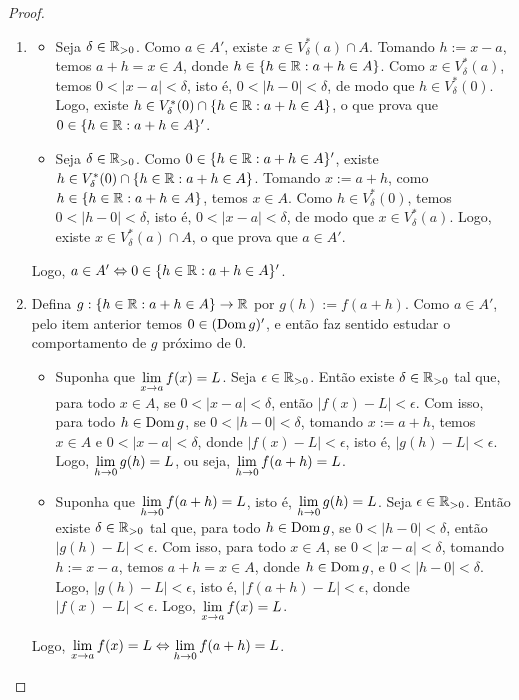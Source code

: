 \begin{proof}
    \leavevmode
        \begin{enumerate}[leftmargin=*, align=left, label=\textbf{(\alph*)}]
            \item 
                \begin{itemize}[leftmargin=*, style=nextline]
                    \item[($\Rightarrow$)] Seja $\delta \in \mathbb{R}_{>0}$. Como $a \in A'$, existe $x \in V^*_{\delta}(a) \cap A$. Tomando $h := x-a$, temos $a+h = x \in A$, donde $h \in \{h \in \mathbb{R} : a+h \in A\}$. Como $x \in V^*_{\delta}(a)$, temos $0 < |x-a| < \delta$, isto é, $0 < |h-0| < \delta$, de modo que $h \in V^*_{\delta}(0)$. Logo, existe $h \in V^*_{\delta}(0) \cap \{h \in \mathbb{R} : a+h \in A\}$, o que prova que $0 \in \{h \in \mathbb{R} : a+h \in A\}'$.
                    \item[($\Leftarrow$)] Seja $\delta \in \mathbb{R}_{>0}$. Como $0 \in \{h \in \mathbb{R} : a+h \in A\}'$, existe $h \in V^*_{\delta}(0) \cap \{h \in \mathbb{R} : a+h \in A\}$. Tomando $x := a+h$, como $h \in \{h \in \mathbb{R} : a+h \in A\}$, temos $x \in A$. Como $h \in V^*_{\delta}(0)$, temos $0 < |h-0| < \delta$, isto é, $0 < |x-a| < \delta$, de modo que $x \in V^*_{\delta}(a)$. Logo, existe $x \in V^*_{\delta}(a) \cap A$, o que prova que $a \in A'$.
                \end{itemize}
            Logo, $a \in A' \Leftrightarrow 0 \in \{h \in \mathbb{R} : a+h \in A\}'$. \blackproof
            \item Defina $g : \{h \in \mathbb{R} : a+h \in A\} \to \mathbb{R}$ por $g(h) := f(a+h)$. Como $a \in A'$, pelo item anterior temos $0 \in (\operatorname{Dom} g)'$, e então faz sentido estudar o comportamento de $g$ próximo de $0$.
                \begin{itemize}
                    \item[($\Rightarrow$)] Suponha que $\displaystyle \lim_{x \to a} f(x) = L$. Seja $\epsilon \in \mathbb{R}_{>0}$. Então existe $\delta \in \mathbb{R}_{>0}$ tal que, para todo $x \in A$, se $0<|x-a|<\delta$, então $|f(x) - L| < \epsilon$. Com isso, para todo $h \in \operatorname{Dom} g$, se $0<|h-0|<\delta$, tomando $x := a+h$, temos $x \in A$ e $0 < |x-a| < \delta$, donde $|f(x) - L| < \epsilon$, isto é, $|g(h) - L| < \epsilon$. Logo, $\displaystyle \lim_{h \to 0} g(h) = L$, ou seja, $\displaystyle \lim_{h \to 0} f(a+h) = L$.
                    \item[($\Leftarrow$)] Suponha que $\displaystyle \lim_{h \to 0} f(a+h) = L$, isto é, $\displaystyle \lim_{h \to 0} g(h) = L$. Seja $\epsilon \in \mathbb{R}_{>0}$. Então existe $\delta \in \mathbb{R}_{>0}$ tal que, para todo $h \in \operatorname{Dom} g$, se $0<|h-0|<\delta$, então $|g(h) - L| < \epsilon$. Com isso, para todo $x \in A$, se $0<|x-a|<\delta$, tomando $h := x-a$, temos $a+h = x \in A$, donde $h \in \operatorname{Dom} g$, e $0 < |h-0| < \delta$. Logo, $|g(h) - L| < \epsilon$, isto é, $|f(a+h) - L| < \epsilon$, donde $|f(x) - L| < \epsilon$. Logo, $\displaystyle \lim_{x \to a} f(x) = L$.
                \end{itemize}
            Logo, $\displaystyle \lim_{x \to a} f(x) = L \Leftrightarrow \lim_{h \to 0} f(a+h) = L$. \blackproof
        \end{enumerate}
\end{proof}

